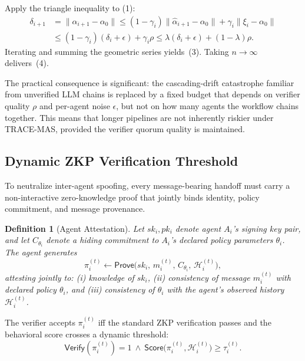 \documentclass[conference]{IEEEtran}
\newtheorem{definition}{Definition}
\begin{document}
\begin{IEEEproof}
Apply the triangle inequality to (1):
\begin{align*}
\delta_{i+1} &= \|\alpha_{i+1} - \alpha_0\|
\leq (1-\gamma_i)\|\hat{\alpha}_{i+1} - \alpha_0\| +
\gamma_i\|\xi_i - \alpha_0\|\\
&\leq (1-\gamma_i)(\delta_i + \epsilon) + \gamma_i \rho
\leq \lambda(\delta_i + \epsilon) + (1-\lambda)\rho.
\end{align*}
Iterating and summing the geometric series yields~(3).
Taking $n \to \infty$ delivers~(4).
\end{IEEEproof}

The practical consequence is significant: the cascading-drift
catastrophe familiar from unverified LLM chains is replaced by a
fixed budget that depends on verifier quality $\rho$ and per-agent
noise $\epsilon$, but not on how many agents the workflow chains
together. This means that longer pipelines are not inherently riskier
under \textsc{TRACE-MAS}, provided the verifier quorum quality
is maintained.

\subsection{Dynamic ZKP Verification Threshold}
\label{subsec:zkp}

To neutralize inter-agent spoofing, every message-bearing handoff must
carry a non-interactive zero-knowledge proof that jointly binds identity,
policy commitment, and message provenance.

\begin{definition}[Agent Attestation]
Let $sk_i, pk_i$ denote agent $A_i$'s signing key pair, and let
$C_{\theta_i}$ denote a hiding commitment to $A_i$'s declared policy
parameters $\theta_i$. The agent generates
\[
\pi_i^{(t)} \leftarrow \mathsf{Prove}\bigl(sk_i,\, m_i^{(t)},\,
C_{\theta_i},\, \mathcal{H}_i^{(t)}\bigr),
\]
attesting jointly to: (i) knowledge of $sk_i$,
(ii) consistency of message $m_i^{(t)}$ with declared policy $\theta_i$,
and (iii) consistency of $\theta_i$ with the agent's observed history
$\mathcal{H}_i^{(t)}$.
\end{definition}

The verifier accepts $\pi_i^{(t)}$ iff the standard ZKP verification
passes and the behavioral score crosses a dynamic threshold:
\begin{equation}
\mathsf{Verify}(\pi_i^{(t)}) = 1 \ \wedge\
\mathsf{Score}\bigl(\pi_i^{(t)}, \mathcal{H}_i^{(t)}\bigr) \geq
\tau_i^{(t)}.
\end{equation}
\end{document}
